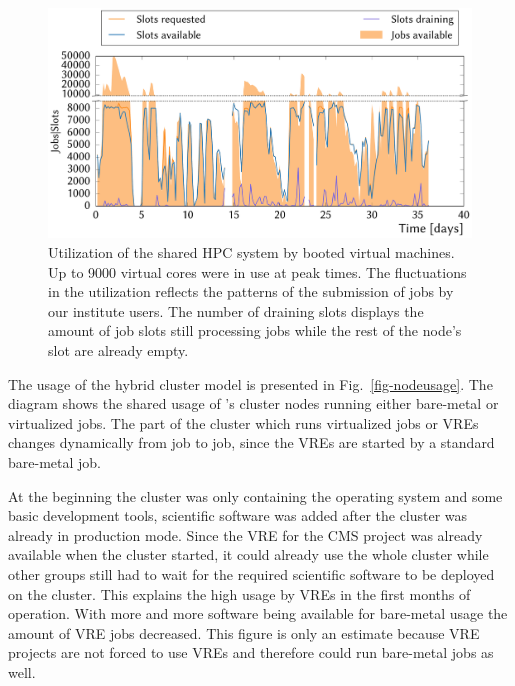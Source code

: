 \begin{figure}
\begin{center}
  \includegraphics[width=1.0\linewidth]{figures/NEMO_KIT_utiliztion.pdf}
  \caption{Utilization of the shared HPC system by booted virtual machines. Up to 9000 virtual cores were in use at peak times. The fluctuations in the utilization reflects the patterns of the submission of jobs by our institute users. The number of draining slots displays the amount of job slots still processing jobs while the rest of the node's slot are already empty.}
  \label{fig-frplots}
\end{center}
\end{figure}

The usage of the hybrid cluster model is presented in Fig.~\ref{fig-nodeusage}.
The diagram shows the shared usage of \NEMO's cluster nodes running either
bare-metal or virtualized jobs. The part of the cluster which runs virtualized
jobs or VREs changes dynamically from job to job, since the VREs are started by
a standard bare-metal job.

At the beginning the cluster was only containing the operating system and some
basic development tools, scientific software was added after the cluster was
already in production mode. Since the VRE for the CMS project was already
available when the \NEMO cluster started, it could already use the whole cluster
while other groups still had to wait for the required scientific software to be deployed on
the cluster. This explains the high usage by VREs in the first months of
operation. With more and more software being available for bare-metal usage the
amount of VRE jobs decreased. This figure is only an estimate because VRE
projects are not forced to use VREs and therefore could run bare-metal jobs as
well.



